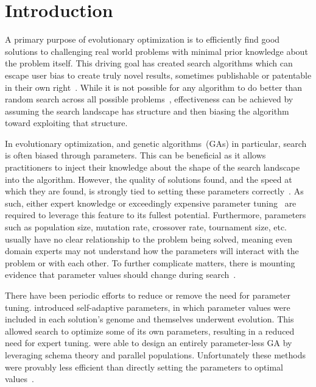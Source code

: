 \chapter{Introduction}
\label{chap-introduction}
A primary purpose of evolutionary optimization is to efficiently find good solutions
to challenging real world problems with minimal prior knowledge about the problem itself.
This driving goal has created search algorithms which can escape user bias to create
truly novel results, sometimes publishable or patentable in their own right~\cite{kannappan:2014:humies}.
While it is not possible for any algorithm to do better than random search across all possible
problems~\cite{Wolpert:1997:nfl}, effectiveness can be achieved by assuming the search
landscape has structure and then biasing the algorithm toward exploiting that structure.

In evolutionary optimization, and genetic algorithms~(GAs) in particular, search is often
biased through parameters. This can be beneficial as it allows practitioners to inject their
knowledge about the shape of the search landscape into the algorithm.
However, the quality of solutions found, and the speed at which they are found, is strongly tied to setting these parameters
correctly~\cite{goldberg:1991:gasize}. As such, either expert knowledge or exceedingly
expensive parameter tuning~\cite{grefenstette:1986:optimalga} are required to leverage
this feature to its fullest potential. Furthermore,  parameters such as population size, mutation rate, crossover
rate, tournament size, etc. usually have no clear relationship to the problem being solved, meaning even
domain experts may not understand how the parameters will interact with the problem or with each other.
To further complicate matters, there is mounting evidence that parameter values should change
during search~\cite{goldman:2011:dynamic-parameters,laporte:2014:adaptivepop}.

There have been periodic efforts to reduce or remove the need for parameter tuning.
\cite{rechenberg:1973:es} introduced self-adaptive parameters, in which parameter values
were included in each solution's genome and themselves underwent evolution. This allowed search
to optimize some of its own parameters, resulting in a reduced need for expert tuning.
\cite{harik:1999:parameterlessga} were able to design an entirely parameter-less GA by
leveraging schema theory and parallel populations. Unfortunately these methods were provably less efficient
than directly setting the parameters to optimal values~\cite{pelikan:1999:worstparameter-less}.

